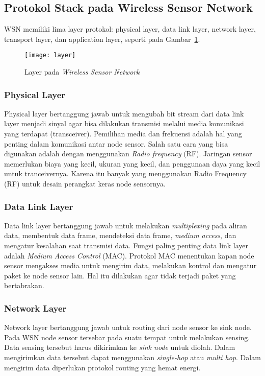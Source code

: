 \subsection{Protokol Stack pada Wireless Sensor Network}
WSN memiliki lima layer protokol: physical layer, data link layer, network layer, transport layer, dan application layer, seperti pada Gambar~\ref{fig:layer}. 
\begin{figure} [H]
	\centering  
	\texttt{[image: layer]}  
	\caption[Layer pada \textit{Wireless Sensor Network}]{Layer pada \textit{Wireless Sensor Network}} 
	\label{fig:layer} 
\end{figure} 

\subsubsection{Physical Layer}
Physical layer bertanggung jawab untuk mengubah bit stream dari data link layer menjadi sinyal agar bisa dilakukan transmisi melalui media komunikasi yang terdapat (transceiver). Pemilihan media dan frekuensi adalah hal yang penting dalam komunikasi antar node sensor. Salah satu cara yang bisa digunakan adalah dengan menggunakan \textit{Radio frequency} (RF). Jaringan sensor memerlukan biaya yang kecil, ukuran yang kecil, dan penggunaan daya yang kecil untuk tranceivernya. Karena itu banyak yang menggunakan Radio Frequency (RF) untuk desain perangkat keras node sensornya.

\subsubsection{Data Link Layer}
Data link layer bertanggung jawab untuk melakukan \textit{multiplexing} pada aliran data, membentuk data frame, mendeteksi data frame, \textit{medium access}, dan mengatur kesalahan saat transmisi data. Fungsi paling penting data link layer adalah \textit{Medium Access Control} (MAC). Protokol MAC menentukan kapan node sensor mengakses media untuk mengirim data, melakukan kontrol dan mengatur paket ke node sensor lain. Hal itu dilakukan agar tidak terjadi paket yang bertabrakan. 

\subsubsection{Network Layer}
Network layer bertanggung jawab untuk routing dari node sensor ke sink node. Pada WSN node sensor tersebar pada suatu tempat untuk melakukan sensing. Data sensing tersebut harus dikirimkan ke \textit{sink node} untuk diolah. Dalam mengirimkan data tersebut dapat menggunakan \textit{single-hop} atau \textit{multi hop}. Dalam mengirim data diperlukan protokol routing yang hemat energi.

